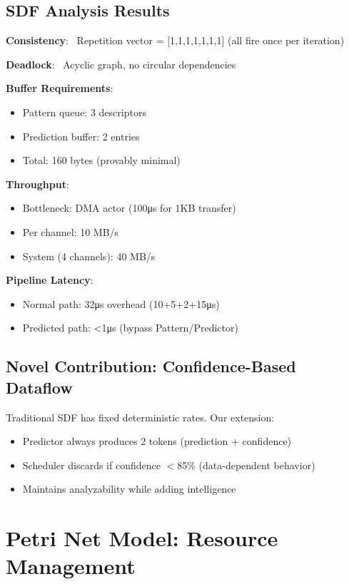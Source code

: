 \documentclass[conference]{IEEEtran}
\newcommand{\cmark}{\ding{51}}%
\begin{document}
\subsection{SDF Analysis Results}
\textbf{Consistency}: \cmark\ Repetition vector = [1,1,1,1,1,1,1] (all fire once per iteration)

\textbf{Deadlock}: \cmark\ Acyclic graph, no circular dependencies

\textbf{Buffer Requirements}:
\begin{itemize}
    \item Pattern queue: 3 descriptors
    \item Prediction buffer: 2 entries
    \item Total: 160 bytes (provably minimal)
\end{itemize}

\textbf{Throughput}:
\begin{itemize}
    \item Bottleneck: DMA actor (100μs for 1KB transfer)
    \item Per channel: 10 MB/s
    \item System (4 channels): 40 MB/s
\end{itemize}

\textbf{Pipeline Latency}:
\begin{itemize}
    \item Normal path: 32μs overhead (10+5+2+15μs)
    \item Predicted path: <1μs (bypass Pattern/Predictor)
\end{itemize}

\subsection{Novel Contribution: Confidence-Based Dataflow}
Traditional SDF has fixed deterministic rates. Our extension:
\begin{itemize}
    \item Predictor always produces 2 tokens (prediction + confidence)
    \item Scheduler discards if confidence $<$85\% (data-dependent behavior)
    \item Maintains analyzability while adding intelligence
\end{itemize}

\section{Petri Net Model: Resource Management}
\end{document}
